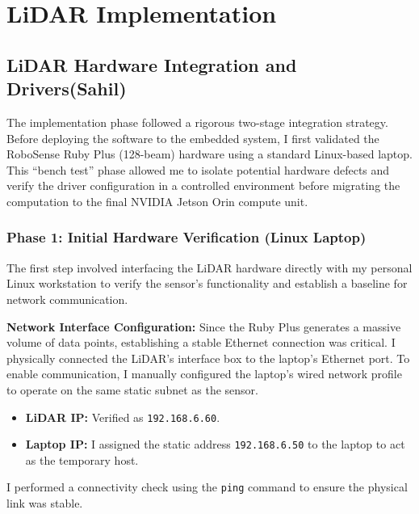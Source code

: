 \documentclass[12pt,a4paper]{report}
\begin{document}
\chapter{LiDAR Implementation}



\section[LiDAR Integration]{LiDAR Hardware Integration and Drivers(Sahil)}


The implementation phase followed a rigorous two-stage integration strategy. Before deploying the software to the embedded system, I first validated the RoboSense Ruby Plus (128-beam) hardware using a standard Linux-based laptop. This ``bench test'' phase allowed me to isolate potential hardware defects and verify the driver configuration in a controlled environment before migrating the computation to the final NVIDIA Jetson Orin compute unit.

\subsection{Phase 1: Initial Hardware Verification (Linux Laptop)}
The first step involved interfacing the LiDAR hardware directly with my personal Linux workstation to verify the sensor's functionality and establish a baseline for network communication.

\textbf{Network Interface Configuration:} Since the Ruby Plus generates a massive volume of data points, establishing a stable Ethernet connection was critical. I physically connected the LiDAR’s interface box to the laptop’s Ethernet port. To enable communication, I manually configured the laptop's wired network profile to operate on the same static subnet as the sensor.

\begin{itemize}
    \item \textbf{LiDAR IP:} Verified as \texttt{192.168.6.60}.
    \item \textbf{Laptop IP:} I assigned the static address \texttt{192.168.6.50} to the laptop to act as the temporary host.
\end{itemize}

I performed a connectivity check using the \texttt{ping} command to ensure the physical link was stable.
\end{document}
